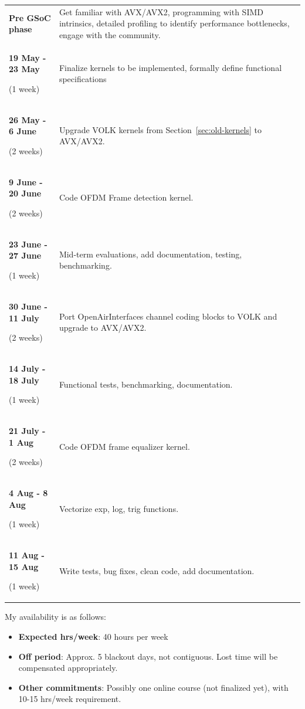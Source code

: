 \documentclass[a4paper,12pt,oneside]{article}
\begin{document}
\begin{table}[H]
\centering
\begin{tabular}{>{\bfseries}p{3.8cm} p{10.2cm}}
\hline
Pre GSoC phase & Get familiar with AVX/AVX2, programming with SIMD intrinsics, detailed profiling to identify performance bottlenecks, engage with the community. \\ 
19 May - 23 May \par \textnormal{(1 week)} & Finalize kernels to be implemented, formally define functional specifications \\
26 May - 6 June \par \textnormal{(2 weeks)} & Upgrade VOLK kernels from Section~\ref{sec:old-kernels} to AVX/AVX2. \\
9 June - 20 June \par \textnormal{(2 weeks)} & Code OFDM Frame detection kernel. \\ 
23 June - 27 June \par \textnormal{(1 week)} & Mid-term evaluations, add documentation, testing, benchmarking. \\ 
30 June - 11 July \par \textnormal{(2 weeks)} & Port OpenAirInterfaces channel coding blocks to VOLK and upgrade to AVX/AVX2. \\ 
14 July - 18 July \par \textnormal{(1 week)} & Functional tests, benchmarking, documentation. \\ 
21 July - 1 Aug \par \textnormal{(2 weeks)} & Code OFDM frame equalizer kernel. \\ 
4 Aug - 8 Aug \par \textnormal{(1 week)} & Vectorize exp, log, trig functions. \\ 
11 Aug - 15 Aug \par \textnormal{(1 week)} & Write tests, bug fixes, clean code, add documentation. \\ 
\hline
\end{tabular}
\end{table}

My availability is as follows:

\begin{itemize}
\item \textbf{Expected hrs/week}: 40 hours per week
\item \textbf{Off period}: Approx. 5 blackout days, not contiguous. Lost time will be compensated appropriately.
\item \textbf{Other commitments}: Possibly one online course (not finalized yet), with 10-15 hrs/week requirement.
\end{itemize}
\end{document}
